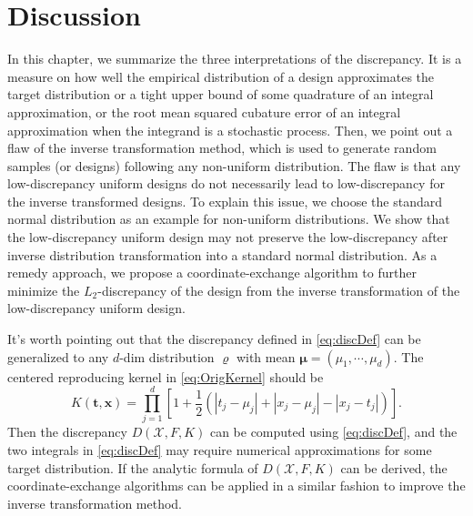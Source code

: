 \documentclass[graybox]{svmult}
\newcommand{\vx}{\boldsymbol{x}}
\newcommand{\vt}{\boldsymbol{t}}
\newcommand{\Xdes}{\mathcal{X}}
\newcommand{\Ftar}{F}
\begin{document}
\section{Discussion}
In this chapter, we summarize the three interpretations of the discrepancy. 
It is a measure on how well the empirical distribution of a design approximates the target distribution or a tight upper bound of some quadrature of an integral approximation, or the root mean squared cubature error of an integral approximation when the integrand is a stochastic process. 
Then, we point out a flaw of the inverse transformation method, which is used to generate random samples (or designs) following any non-uniform distribution. 
The flaw is that any low-discrepancy uniform designs do not necessarily lead to low-discrepancy for the inverse transformed designs. 
To explain this issue, we choose the standard normal distribution as an example for non-uniform distributions. 
We show that the low-discrepancy uniform design may not preserve the low-discrepancy after inverse distribution transformation into a standard normal distribution. 
As a remedy approach, we propose a coordinate-exchange algorithm to further minimize the $L_2$-discrepancy of the design from the inverse transformation of the low-discrepancy uniform design. 

It's worth pointing out that the discrepancy defined in \eqref{eq:discDef} can be generalized to any $d$-dim distribution $\varrho$ with mean $\boldsymbol{\mu} = (\mu_1,\cdots,\mu_d)$. The centered reproducing kernel in \eqref{eq:OrigKernel} should be 
\begin{equation} \label{ExtKernel}
     K(\vt,\vx)  = \prod\limits_{j=1}^d\left[1+ \frac 12 \left(|t_j-\mu_j|+ |x_j-\mu_j|- |x_j-t_j| \right)\right].
\end{equation}
Then the discrepancy $D(\Xdes,\Ftar,K)$ can be computed using \eqref{eq:discDef}, and the two integrals in \eqref{eq:discDef} may require numerical approximations for some target distribution. 
If the analytic formula of $D(\Xdes,\Ftar,K)$ can be derived, the coordinate-exchange algorithms can be applied in a similar fashion to improve the inverse transformation method. 
\end{document}
